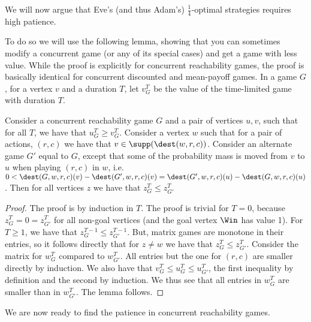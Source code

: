 We will now argue that Eve's (and thus Adam's) $\frac{1}{4}$-optimal strategies requires high patience.

To do so we will use the following lemma, showing that you can sometimes modify a concurrent game (or any of its special cases) and get a game with less value. While the proof is explicitly for concurrent reachability games, the proof is basically identical for concurrent discounted and mean-payoff games.
In a game $G$, for a vertex $v$ and a duration $T$, let $v^T_G$ be the value of the time-limited game with duration $T$.

\begin{lemma}\label{lem:change_succ}
Consider a concurrent reachability game $G$ and a pair of vertices $u,v$, such that for all $T$, we have that $u^T_G\geq v^T_G$. Consider a vertex $w$ such that for a pair of actions, $(r,c)$ we have that $v\in \supp(\dest(w,r,c))$. Consider an alternate game $G'$ equal to $G$, except that some of the probability mass is moved from $v$ to $u$ when playing $(r,c)$ in $w$, i.e. $0<\dest(G,w,r,c)(v)-\dest(G',w,r,c)(v)=\dest(G',w,r,c)(u)-\dest(G,w,r,c)(u)$.
Then for all vertices $z$ we have that $z^T_G\leq z^T_{G'}$
\end{lemma}
\begin{proof}
The proof is by induction in $T$.
The proof is trivial for $T=0$, because $z^T_G=0= z^T_{G'}$ for all non-goal vertices (and the goal vertex $\Win$ has value 1).
For $T\geq 1$, we have that $z^{T-1}_G\leq z^{T-1}_{G'}$.
But, matrix games are monotone in their entries, so it follows directly that for $z\neq w$ we have that $z^{T}_G\leq z^{T}_{G'}$.
Consider the matrix for $w^T_G$ compared to $w^T_{G'}$. All entries but the one for $(r,c)$ are smaller directly by induction. We also have that $v^T_{G}\leq u^T_{G}\leq u^T_{G'}$, the first inequality by definition and the second by induction. We thus see that all entries in $w^T_{G}$ are smaller than in $w^T_{G'}$.
The lemma follows.
\end{proof}

We are now ready to find the patience in concurrent reachability games.

